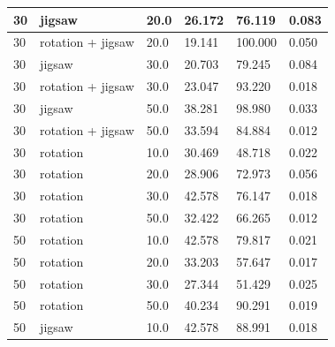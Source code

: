 \begin{longtable}{|| p{} | p{} | p{} | p{} | p{} | p{} ||}
    30                & jigsaw            & 20.0           & 26.172                    & 76.119                 & 0.083   \\ \hline
    30                & rotation + jigsaw & 20.0           & 19.141                    & 100.000                & 0.050   \\ \hline
    30                & jigsaw            & 30.0           & 20.703                    & 79.245                 & 0.084   \\ \hline
    30                & rotation + jigsaw & 30.0           & 23.047                    & 93.220                 & 0.018   \\ \hline
    30                & jigsaw            & 50.0           & 38.281                    & 98.980                 & 0.033   \\ \hline
    30                & rotation + jigsaw & 50.0           & 33.594                    & 84.884                 & 0.012   \\ \hline
    30                & rotation          & 10.0           & 30.469                    & 48.718                 & 0.022   \\ \hline
    30                & rotation          & 20.0           & 28.906                    & 72.973                 & 0.056   \\ \hline
    30                & rotation          & 30.0           & 42.578                    & 76.147                 & 0.018   \\ \hline
    30                & rotation          & 50.0           & 32.422                    & 66.265                 & 0.012   \\ \hline
    \rowcolor{green}
    50                & rotation          & 10.0           & 42.578                    & 79.817                 & 0.021   \\ \hline
    50                & rotation          & 20.0           & 33.203                    & 57.647                 & 0.017   \\ \hline
    50                & rotation          & 30.0           & 27.344                    & 51.429                 & 0.025   \\ \hline
    50                & rotation          & 50.0           & 40.234                    & 90.291                 & 0.019   \\ \hline
    50                & jigsaw            & 10.0           & 42.578                    & 88.991                 & 0.018   \\ \hline

\end{longtable}
